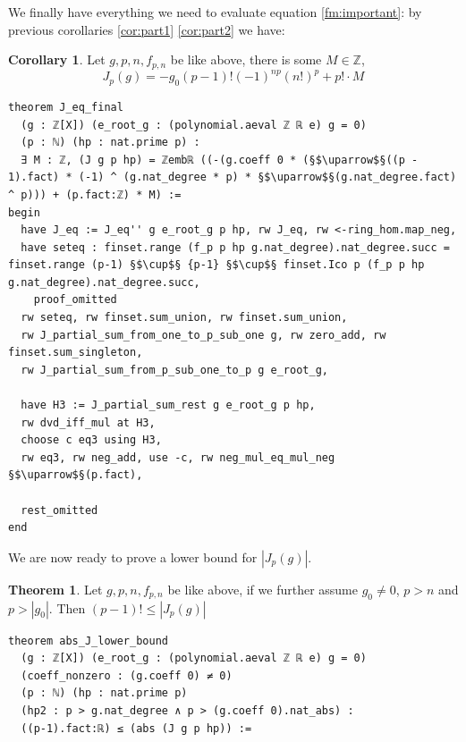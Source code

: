 \documentclass{report}
\theoremstyle{definition}
\newtheorem{theorem}{Theorem}[section]
\newtheorem{corollary}{Corollary}[section]
\begin{document}
We finally have everything we need to evaluate equation \ref{fm:important}: by previous corollaries \ref{cor:part1} \ref{cor:part2} we have:
\begin{corollary}
Let $g,p,n,f_{p,n}$ be like above, there is some $M\in\mathbb Z$,
$$
J_p(g)=-g_0(p-1)!(-1)^{np} (n!)^p + p!\cdot M
$$
\begin{verbatim}
theorem J_eq_final 
  (g : ℤ[X]) (e_root_g : (polynomial.aeval ℤ ℝ e) g = 0) 
  (p : ℕ) (hp : nat.prime p) : 
  ∃ M : ℤ, (J g p hp) = ℤembℝ ((-(g.coeff 0 * (§$\uparrow$§((p - 1).fact) * (-1) ^ (g.nat_degree * p) * §$\uparrow$§(g.nat_degree.fact) ^ p))) + (p.fact:ℤ) * M) :=
begin
  have J_eq := J_eq'' g e_root_g p hp, rw J_eq, rw <-ring_hom.map_neg,
  have seteq : finset.range (f_p p hp g.nat_degree).nat_degree.succ = finset.range (p-1) §$\cup$§ {p-1} §$\cup$§ finset.Ico p (f_p p hp g.nat_degree).nat_degree.succ,
    proof_omitted
  rw seteq, rw finset.sum_union, rw finset.sum_union, 
  rw J_partial_sum_from_one_to_p_sub_one g, rw zero_add, rw finset.sum_singleton,
  rw J_partial_sum_from_p_sub_one_to_p g e_root_g,
  
  have H3 := J_partial_sum_rest g e_root_g p hp,
  rw dvd_iff_mul at H3,
  choose c eq3 using H3,
  rw eq3, rw neg_add, use -c, rw neg_mul_eq_mul_neg §$\uparrow$§(p.fact),

  rest_omitted
end
\end{verbatim}
\end{corollary}

We are now ready to prove a lower bound for $|J_p(g)|$.
\begin{theorem}
Let $g,p,n,f_{p,n}$ be like above, if we further assume $g_0\ne 0$, $p>n$ and $p>|g_0|$. Then $(p-1)!\le |J_p(g)|$
\begin{verbatim}
theorem abs_J_lower_bound 
  (g : ℤ[X]) (e_root_g : (polynomial.aeval ℤ ℝ e) g = 0) 
  (coeff_nonzero : (g.coeff 0) ≠ 0) 
  (p : ℕ) (hp : nat.prime p) 
  (hp2 : p > g.nat_degree ∧ p > (g.coeff 0).nat_abs) : 
  ((p-1).fact:ℝ) ≤ (abs (J g p hp)) :=
\end{verbatim}
\end{theorem}
\end{document}
